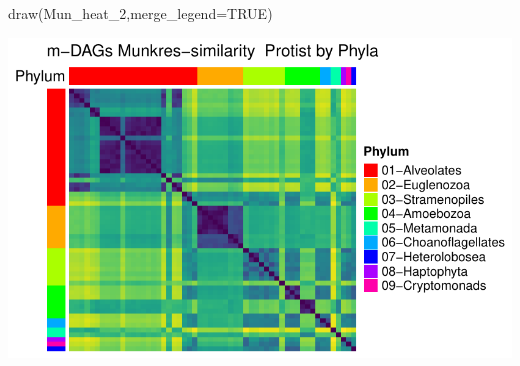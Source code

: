 \documentclass[
  letterpaper,
  DIV=11,
  numbers=noendperiod]{scrreprt}
\newenvironment{Shaded}{}{}
\newcommand{\AttributeTok}[1]{\textcolor[rgb]{0.78,0.47,0.87}{#1}}
\newcommand{\ConstantTok}[1]{\textcolor[rgb]{0.82,0.60,0.40}{#1}}
\newcommand{\FunctionTok}[1]{\textcolor[rgb]{0.38,0.69,0.94}{#1}}
\newcommand{\NormalTok}[1]{\textcolor[rgb]{0.67,0.70,0.75}{#1}}
\begin{document}
\begin{Shaded}
\begin{Highlighting}[]
\FunctionTok{draw}\NormalTok{(Mun\_heat\_2,}\AttributeTok{merge\_legend=}\ConstantTok{TRUE}\NormalTok{)}
\end{Highlighting}
\end{Shaded}

\includegraphics[width=1\textwidth,height=\textheight]{appendix_files/figure-pdf/unnamed-chunk-16-2.pdf}
\end{document}
